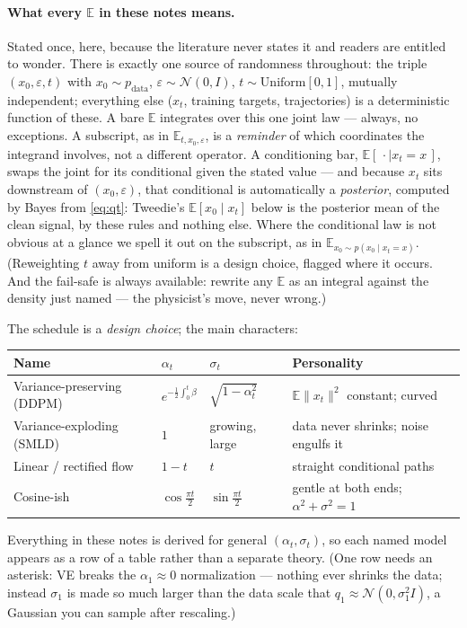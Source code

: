 \documentclass[10pt,a4paper]{article}
\newcommand{\E}{\mathbb{E}}
\newcommand{\veps}{\varepsilon}
\begin{document}
\paragraph{What every $\E$ in these notes means.}
Stated once, here, because the literature never states it and readers
are entitled to wonder. There is exactly one source of randomness
throughout: the triple $(x_0, \veps, t)$ with
$x_0 \sim p_{\mathrm{data}}$, $\veps \sim \mathcal{N}(0, I)$,
$t \sim \mathrm{Uniform}[0, 1]$, mutually independent; everything else
($x_t$, training targets, trajectories) is a deterministic function of
these. A bare $\E$ integrates over this one joint law --- always, no
exceptions. A subscript, as in $\E_{t, x_0, \veps}$, is a
\emph{reminder} of which coordinates the integrand involves, not a
different operator. A conditioning bar, $\E[\,\cdot \mid x_t = x\,]$,
swaps the joint for its conditional given the stated value --- and
because $x_t$ sits downstream of $(x_0, \veps)$, that conditional is
automatically a \emph{posterior}, computed by Bayes from \eqref{eq:qt}:
Tweedie's $\E[x_0 \mid x_t]$ below is the posterior mean of the clean
signal, by these rules and nothing else. Where the conditional law is
not obvious at a glance we spell it out on the subscript, as in
$\E_{x_0 \sim p(x_0 \mid x_t = x)}$. (Reweighting $t$ away from uniform
is a design choice, flagged where it occurs. And the fail-safe is
always available: rewrite any $\E$ as an integral against the density
just named --- the physicist's move, never wrong.)

The schedule is
a \emph{design choice}; the main characters:
\begin{center}
\small
\begin{tabular}{@{}llll@{}}
\toprule
Name & $\alpha_t$ & $\sigma_t$ & Personality \\
\midrule
Variance-preserving (DDPM) & $e^{-\frac12\int_0^t\beta}$ & $\sqrt{1-\alpha_t^2}$ & $\E\|x_t\|^2$ constant; curved \\
Variance-exploding (SMLD) & $1$ & growing, large & data never shrinks; noise engulfs it \\
Linear / rectified flow & $1-t$ & $t$ & straight conditional paths \\
Cosine-ish & $\cos\frac{\pi t}{2}$ & $\sin\frac{\pi t}{2}$ & gentle at both ends; $\alpha^2{+}\sigma^2{=}1$ \\
\bottomrule
\end{tabular}
\end{center}
Everything in these notes is derived for general $(\alpha_t, \sigma_t)$, so
each named model appears as a row of a table rather than a separate theory.
(One row needs an asterisk: VE breaks the $\alpha_1 \approx 0$ normalization
--- nothing ever shrinks the data; instead $\sigma_1$ is made so much larger
than the data scale that $q_1 \approx \mathcal{N}(0, \sigma_1^2 I)$, a
Gaussian you can sample after rescaling.)
\end{document}
